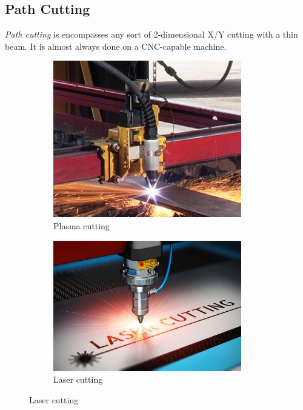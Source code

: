  
 \subsection{Path Cutting}
 
 \textit{Path cutting} is encompasses any sort of 2-dimensional X/Y cutting with a thin beam. It is almost always done on a CNC-capable machine.
 
 \begin{figure}[H]
		\begin{subfigure}[b]{.24\linewidth}
			\includegraphics[width=0.9\textwidth]{imgs/plasmacut.jpeg}
			\caption{Plasma cutting}
		\end{subfigure}\begin{subfigure}[b]{.24\linewidth}
			\includegraphics[width=0.9\textwidth]{imgs/lasercut.jpeg}
			\caption{Laser cutting}

\end{subfigure}
\end{figure}

